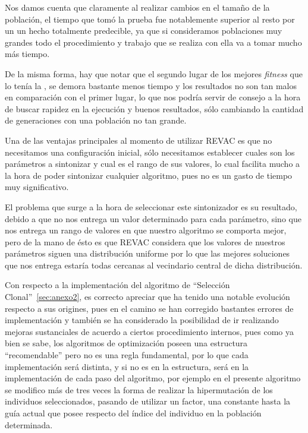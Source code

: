Nos damos cuenta que claramente al realizar cambios en el tamaño de la población, el tiempo que tomó la prueba fue
notablemente superior al resto por un un hecho totalmente predecible, ya que si consideramos poblaciones muy grandes
todo el procedimiento y trabajo que se realiza con ella va a tomar mucho más tiempo.

De la misma forma, hay que notar que el segundo lugar de los mejores \emph{fitness} que lo tenía la ,
se demora bastante menos tiempo y los resultados no son tan malos en comparación con el primer lugar, lo que nos podría
servir de consejo a la hora de buscar rapidez en la ejecución y buenos resultados, sólo cambiando la cantidad de generaciones
con una población no tan grande.


Una de las ventajas principales al momento de utilizar REVAC es que no necesitamos una configuración inicial,
sólo necesitamos establecer cuales son los parámetros a sintonizar y cual es el rango de sus valores, lo cual
facilita mucho a la hora de poder sintonizar cualquier algoritmo, pues no es un gasto de tiempo muy significativo.

El problema que surge a la hora de seleccionar este sintonizador es su resultado, debido a que no nos entrega
un valor determinado para cada parámetro, sino que nos entrega un rango de valores en que nuestro algoritmo se comporta mejor,
pero de la mano de ésto es que REVAC considera que los valores de nuestros parámetros siguen una distribución uniforme
por lo que las mejores soluciones que nos entrega estaría todas cercanas al vecindario central de dicha distribución.

Con respecto a la implementación del algoritmo de ``Selección Clonal''~\ref{sec:anexo2}, es correcto apreciar que ha tenido una notable
evolución respecto a sus origines, pues en el camino se han corregido bastantes errores de implementación y también
se ha considerado la posibilidad de ir realizando mejoras sustanciales de acuerdo a ciertos procedimiento internos,
pues como ya bien se sabe, los algoritmos de optimización poseen una estructura ``recomendable'' pero no es una regla
fundamental, por lo que cada implementación será distinta, y si no es en la estructura, será en la implementación de cada
paso del algoritmo, por ejemplo en el presente algoritmo se modifico más de tres veces la forma de realizar la hipermutación
de los individuos seleccionados, pasando de utilizar un factor, una constante hasta la guía actual que posee respecto
del índice del individuo en la población determinada.

